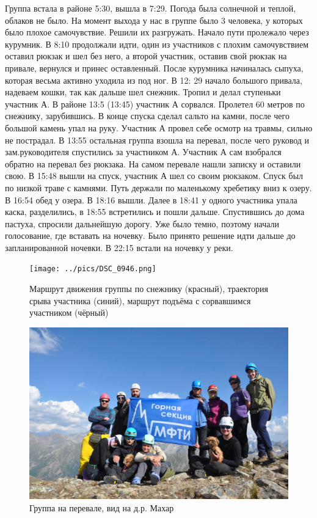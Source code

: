 Группа встала в районе 5:30, вышла в 7:29. Погода была солнечной и теплой, облаков не было. На момент выхода у нас в группе было 3 человека, у которых было плохое самочувствие. Решили их разгружать. Начало пути пролежало через курумник.  В 8:10 продолжали идти, один из участников с плохим самочувствием оставил рюкзак и шел без него, а второй участник, оставив свой рюкзак на привале, вернулся и принес оставленный.  После курумника начиналась сыпуха, которая весьма активно уходила из под ног. В 12: 29 начало большого привала, надеваем кошки, так как дальше шел снежник. Тропил и делал ступеньки участник А. В районе 13:5 (13:45) участник А сорвался. Пролетел 60 метров по снежнику, зарубившись. В конце спуска сделал сальто на камни, после чего большой камень упал на руку. Участник А провел себе осмотр на травмы, сильно не пострадал. В 13:55 остальная группа взошла на перевал, после чего руковод и зам.руководителя спустились за участником А. Участник А сам взобрался обратно на перевал без рюкзака. На самом перевале нашли записку и оставили свою.  В 15:48 вышли на спуск, участник А шел со своим рюкзаком. Спуск был по низкой траве с камнями. Путь держали по маленькому хребетику вниз к озеру.  В 16:54 обед у озера. В 18:16 вышли. Далее в 18:41 у одного участника упала каска, разделились, в 18:55 встретились и пошли дальше. Спустившись до дома пастуха, спросили дальнейшую дорогу. Уже было темно, поэтому начали голосование, где вставать на ночевку. Было принято решение идти дальше до запланированной ночевки. 
В 22:15 встали на ночевку у реки.



\begin{figure}[h!]
	\centering
	\texttt{[image: ../pics/DSC\_0946.png]}
	\caption{Маршрут движения группы по снежнику (красный), траектория срыва участника (синий), маршрут подъёма с сорвавшимся участником (чёрный)}
	\label{fig:DSC_0946}
\end{figure}


\begin{figure}[h!]
	\centering
	\includegraphics[width=0.7\linewidth]{../pics/DSC_0982}
	\caption{Группа на перевале, вид на д.р. Махар}
	\label{fig:DSC_0982}
\end{figure}

